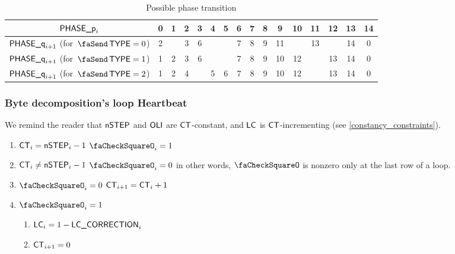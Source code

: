\begin{table}[h]
    \centering
    \begin{tabular}{|c|c|c|c|c|c|c|c|c|c|c|c|c|c|c|c|} \hline
        $\textsf{PHASE\_p}_{i}$                                & 0 & 1 & 2 & 3 & 4 & 5 & 6 & 7 & 8 & 9  & 10 & 11 & 12 & 13 & 14 \\ \hline \hline
        $\textsf{PHASE\_q}_{i + 1}$ (for $\txType = 0$) & 2 &   & 3 & 6 &   &   & 7 & 8 & 9 & 11 &    & 13 &    & 14 & 0  \\ \hline
        $\textsf{PHASE\_q}_{i + 1}$ (for $\txType = 1$) & 1 & 2 & 3 & 6 &   &   & 7 & 8 & 9 & 10 & 12 &    & 13 & 14 & 0  \\ \hline
        $\textsf{PHASE\_q}_{i + 1}$ (for $\txType = 2$) & 1 & 2 & 4 &   & 5 & 6 & 7 & 8 & 9 & 10 & 12 &    & 13 & 14 & 0  \\ \hline
    \end{tabular}
    \caption{Possible phase transition}
    \label{tab:Possible phase transition}
\end{table}

\subsubsection{Byte decomposition's loop Heartbeat}
\begin{center}
\end{center}
We remind the reader that $\textsf{nSTEP}$ and $\textsf{OLI}$ are $\textsf{CT}$-constant, and $\textsf{LC}$ is $\textsf{CT}$-incrementing (see \ref{constancy_constraints}).
\begin{enumerate}
    \item \If $\textsf{CT}_{i} = \textsf{nSTEP}_{i}-1$ \Then $\done_{i} = 1$ 
    \item \If $\textsf{CT}_{i} \ne \textsf{nSTEP}_{i}-1$ \Then $\done_{i} = 0$ in other words, $\done$ is nonzero only at the last row of a loop.
    \item \If $\done_{i} = 0$ \Then $\textsf{CT}_{i + 1} = \textsf{CT}_{i} + 1$
    \item \If $\done_{i} = 1$ \Then 
        \begin{enumerate}
            \item $\textsf{LC}_{i} = 1-\textsf{LC\_CORRECTION}_{i}$
            \item $\textsf{CT}_{i + 1} = 0$
        \end{enumerate}
\end{enumerate}

